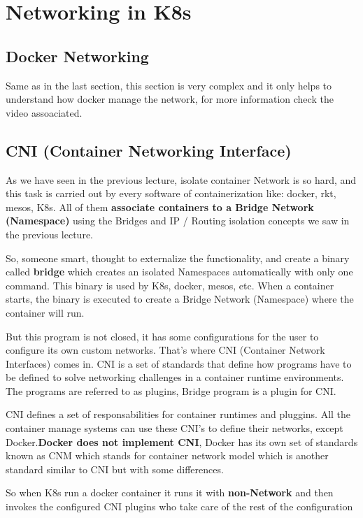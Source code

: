 \documentclass{article}
\begin{document}
\newpage
\section{Networking in K8s}

\subsection{Docker Networking}

Same as in the last section, this section is very complex and it only helps to understand how docker manage the network, for more information check the video assoaciated.

\subsection{CNI (Container Networking Interface)}

As we have seen in the previous lecture, isolate container Network is so hard, and this task is carried out by every software of containerization like: docker, rkt, mesos, K8s. All of them \textbf{associate containers to a Bridge Network (Namespace)} using the Bridges and IP / Routing isolation concepts we saw in the previous lecture.

So, someone smart, thought to externalize the functionality, and create a binary called \textbf{bridge} which creates an isolated Namespaces automatically with only one command. This binary is used by K8s, docker, mesos, etc. When a container starts, the binary is executed to create a Bridge Network (Namespace) where the container will run.

But this program is not closed, it has some configurations for the user to configure its own custom networks. That's where CNI (Container Network Interfaces) comes in. CNI is a set of standards that define how programs have to be defined to solve networking challenges in a container runtime environments. The programs are referred to as plugins, Bridge program is a plugin for CNI.

CNI defines a set of responsabilities  for container runtimes and pluggins. All the container manage systems can use these CNI's to define their networks, except Docker.\textbf{Docker does not implement CNI}, Docker has its own set of standards known as CNM which stands for container network model which is another standard similar to CNI but with some differences.

So when K8s run a docker container it runs it with \textbf{non-Network} and then invokes the configured CNI plugins who take care of the rest of the configuration
\end{document}
